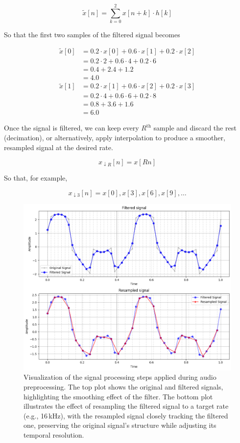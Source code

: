 \documentclass[conference]{IEEEtran}
\begin{document}
$$\tilde{x}[n] = \sum_{k=0}^{2} x[n + k] \cdot h[k]$$

So that the first two samples of the filtered signal becomes

\begin{align*}
	\tilde{x}[0]	&= 0.2 \cdot x[0] + 0.6 \cdot x[1] + 0.2 \cdot x[2] \\
					&= 0.2\cdot2 + 0.6\cdot4 + 0.2\cdot6 \\
					&= 0.4 + 2.4 + 1.2 \\
					&= 4.0\\
	\tilde{x}[1] 	&= 0.2 \cdot x[1] + 0.6 \cdot x[2] + 0.2 \cdot x[3] \\
					&= 0.2\cdot4 + 0.6\cdot6 + 0.2\cdot8 \\
					&= 0.8 + 3.6 + 1.6 \\
					&= 6.0
\end{align*}

Once the signal is filtered, we can keep every $R^\text{th}$ sample and discard the rest (decimation), or alternatively, apply interpolation to produce a smoother, resampled signal at the desired rate.

$$x_{\downarrow R}[n] = x[Rn]$$

So that, for example,

$$x_{\downarrow 3}[n] = x[0], x[3], x[6], x[9], \dots$$


\begin{figure}[H]
	\centering
	\includegraphics[width=0.9\linewidth]{img/img-resampling}
	\caption{Visualization of the signal processing steps applied during audio preprocessing. The top plot shows the original and filtered signals, highlighting the smoothing effect of the filter. The bottom plot illustrates the effect of resampling the filtered signal to a target rate (e.g., 16\,kHz), with the resampled signal closely tracking the filtered one, preserving the original signal’s structure while adjusting its temporal resolution.}
	\label{fig:img-resampling}
\end{figure}
\end{document}
